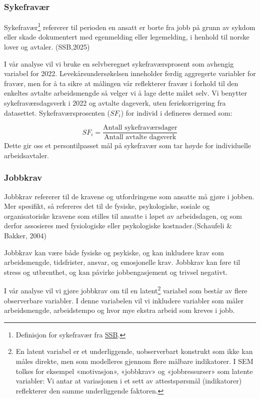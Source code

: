 \documentclass[
  12pt,
  a4paper,
  DIV=11,
  numbers=noendperiod]{scrartcl}
\begin{document}
\subsubsection{Sykefravær}\label{sykefravuxe6r}

Sykefravær\footnote{Definisjon for sykefravær fra
  \href{https://www.ssb.no/arbeid-og-lonn/arbeidsmiljo-sykefravaer-og-arbeidskonflikter/statistikk/sykefravaer}{SSB}.}
refererer til perioden en ansatt er borte fra jobb på grunn av sykdom
eller skade dokumentert med egenmelding eller legemelding, i henhold til
norske lover og avtaler. (SSB,2025)

I vår analyse vil vi bruke en selvberegnet sykefraværsprosent som
avhengig variabel for 2022. Levekårsundersøkelsen inneholder ferdig
aggregerte variabler for fravær, men for å ta sikre at målingen vår
reflekterer fravær i forhold til den enkeltes avtalte arbeidsmengde så
velger vi å lage dette målet selv. Vi benytter sykefraværsdagsverk i
2022 og avtalte dageverk, uten feriekorrigering fra datasettet.
Sykefraværsprosenten (\(SF_i\)) for individ i defineres dermed som:

\[
SF_i = \frac{ \text{Antall sykefraværsdager}}{\text{Antall avtalte dagsverk}} 
\] Dette gir oss et persontilpasset mål på sykefravær som tar høyde for
individuelle arbeidsavtaler.

\subsubsection{Jobbkrav}\label{jobbkrav}

Jobbkrav refererer til de kravene og utfordringene som ansatte må gjøre
i jobben. Mer spesifikt, så refereres det til de fysiske, psykologiske,
sosiale og organisatoriske kravene som stilles til ansatte i løpet av
arbeidsdagen, og som derfor assosieres med fysiologiske eller
psykologiske kostnader.(Schaufeli \& Bakker, 2004)

Jobbkrav kan være både fysiske og psykiske, og kan inkludere krav som
arbeidsmengde, tidsfrister, ansvar, og emosjonelle krav. Jobbkrav kan
føre til stress og utbrenthet, og kan påvirke jobbengasjement og trivsel
negativt.

I vår analyse vil vi gjøre jobbkrav om til en latent\footnote{En latent
  variabel er et underliggende, uobserverbart konstrukt som ikke kan
  måles direkte, men som modelleres gjennom flere målbare indikatorer. I
  SEM tolkes for eksempel «motivasjon», «jobbkrav» og «jobbressurser»
  som latente variabler: Vi antar at variasjonen i et sett av
  attestspørsmål (indikatorer) reflekterer den samme underliggende
  faktoren.} variabel som består av flere observerbare variabler. I
denne variabelen vil vi inkludere variabler som måler arbeidsmengde,
arbeidstempo og hvor mye ekstra arbeid som kreves i jobb.
\end{document}
